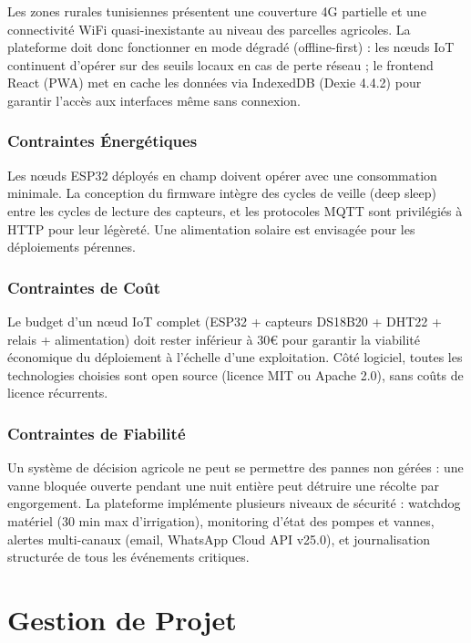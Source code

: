 \documentclass[12pt, a4paper]{report}
\begin{document}
Les zones rurales tunisiennes présentent une couverture 4G partielle et une connectivité WiFi quasi-inexistante au niveau des parcelles agricoles. La plateforme doit donc fonctionner en mode dégradé (offline-first) : les nœuds IoT continuent d'opérer sur des seuils locaux en cas de perte réseau ; le frontend React (PWA) met en cache les données via IndexedDB (Dexie 4.4.2) pour garantir l'accès aux interfaces même sans connexion.

\subsubsection{Contraintes Énergétiques}

Les nœuds ESP32 déployés en champ doivent opérer avec une consommation minimale. La conception du firmware intègre des cycles de veille (deep sleep) entre les cycles de lecture des capteurs, et les protocoles MQTT sont privilégiés à HTTP pour leur légèreté. Une alimentation solaire est envisagée pour les déploiements pérennes.

\subsubsection{Contraintes de Coût}

Le budget d'un nœud IoT complet (ESP32 + capteurs DS18B20 + DHT22 + relais + alimentation) doit rester inférieur à 30€ pour garantir la viabilité économique du déploiement à l'échelle d'une exploitation. Côté logiciel, toutes les technologies choisies sont open source (licence MIT ou Apache 2.0), sans coûts de licence récurrents.

\subsubsection{Contraintes de Fiabilité}

Un système de décision agricole ne peut se permettre des pannes non gérées : une vanne bloquée ouverte pendant une nuit entière peut détruire une récolte par engorgement. La plateforme implémente plusieurs niveaux de sécurité : watchdog matériel (30 min max d'irrigation), monitoring d'état des pompes et vannes, alertes multi-canaux (email, WhatsApp Cloud API v25.0), et journalisation structurée de tous les événements critiques.

\section{Gestion de Projet}
\end{document}

